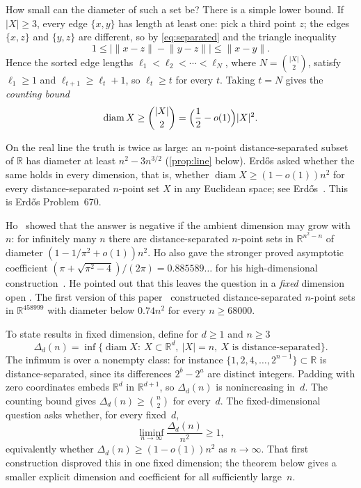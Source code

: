 \documentclass[11pt]{amsart}
\numberwithin{equation}{section}
\theoremstyle{definition}
\theoremstyle{remark}
\newcommand{\R}{\mathbb R}
\newcommand{\norm}[1]{\lVert #1\rVert}
\DeclareMathOperator{\diam}{diam}
\begin{document}
How small can the diameter of such a set be? There is a simple lower
bound. If $|X|\ge3$, every edge $\{x,y\}$ has length at least one: pick a
third point $z$; the edges $\{x,z\}$ and $\{y,z\}$ are different, so by
\eqref{eq:separated} and the triangle inequality
\[
 1\le\bigl|\norm{x-z}-\norm{y-z}\bigr|\le\norm{x-y}.
\]
Hence the sorted edge lengths $\ell_1<\ell_2<\cdots<\ell_N$, where
$N=\binom{|X|}2$, satisfy $\ell_1\ge1$ and $\ell_{t+1}\ge\ell_t+1$, so
$\ell_t\ge t$ for every $t$. Taking $t=N$ gives the \emph{counting bound}
\begin{equation}\label{eq:counting}
 \diam X\ge\binom{|X|}{2}=\Bigl(\frac12-o(1)\Bigr)|X|^2.
\end{equation}

On the real line the truth is twice as large: an $n$-point
distance-separated subset of $\R$ has diameter at least $n^2-3n^{3/2}$
(\cref{prop:line} below). Erd\H{o}s asked whether the same holds in every
dimension, that is, whether $\diam X\ge(1-o(1))n^2$ for every
distance-separated $n$-point set $X$ in any Euclidean space; see
Erd\H{o}s~\cite[Problem~20]{Erdos}. This is Erd\H{o}s Problem~670.

Ho~\cite{Ho} showed that the answer is negative if the ambient dimension
may grow with~$n$: for infinitely many $n$ there are distance-separated
$n$-point sets in $\R^{n^2-n}$ of diameter $(1-1/\pi^2+o(1))n^2$. Ho also
gave the stronger proved asymptotic coefficient
$(\pi+\sqrt{\pi^2-4})/(2\pi)=0.885589\ldots$ for his high-dimensional
construction~\cite[Remark~10]{Ho}. He
pointed out that this leaves the question in a \emph{fixed} dimension open
\cite[Remark~9]{Ho}. The first version of this paper~\cite{Tripodo}
constructed distance-separated $n$-point sets in $\R^{458999}$ with
diameter below $0.74n^2$ for every $n\ge68000$.

To state results in fixed dimension, define for $d\ge1$ and $n\ge3$
\[
 \Delta_d(n)=\inf\bigl\{\diam X:\ X\subset\R^d,\ |X|=n,\
                    X\text{ is distance-separated}\bigr\}.
\]
The infimum is over a nonempty class: for instance
$\{1,2,4,\dots,2^{n-1}\}\subset\R$ is distance-separated, since its
differences $2^b-2^a$ are distinct integers. Padding with zero coordinates
embeds $\R^d$ in $\R^{d+1}$, so $\Delta_d(n)$ is nonincreasing in~$d$.
The counting bound gives $\Delta_d(n)\ge\binom n2$ for every~$d$.
The fixed-dimensional question asks whether, for every fixed~$d$,
\[
 \liminf_{n\to\infty}\frac{\Delta_d(n)}{n^2}\ge1,
\]
equivalently whether $\Delta_d(n)\ge(1-o(1))n^2$ as $n\to\infty$.
That first construction disproved this in one fixed dimension; the theorem
below gives a smaller explicit dimension and coefficient for all
sufficiently large~$n$.
\end{document}
